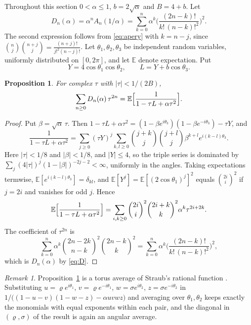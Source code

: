 \documentclass[11pt]{amsart}
\numberwithin{equation}{section}
\newtheorem{proposition}[theorem]{Proposition}
\theoremstyle{definition}
\theoremstyle{remark}
\newtheorem{remark}[theorem]{Remark}
\newcommand{\E}{\mathbb{E}}
\begin{document}
Throughout this section $0<\alpha\le1$, $b=2\sqrt\alpha$ and $B=4+b$. Let
\begin{equation}\label{eq:D}
D_n(\alpha)=\alpha^nA_n(1/\alpha)=\sum_{k=0}^{n}\alpha^k\biggl(\frac{(2n-k)!}{k!\,(n-k)!^2}\biggr)^2 .
\end{equation}
The second expression follows from \eqref{eq:apery} with $k=n-j$, since
$\binom nj\binom{n+j}{j}=\frac{(n+j)!}{j!^2(n-j)!}$. Let
$\theta_1,\theta_2,\theta_3$ be independent random variables, uniformly
distributed on $[0,2\pi]$, and let $\E$ denote expectation. Put
\[
Y=4\cos\theta_1\cos\theta_2,\qquad L=Y+b\cos\theta_3 .
\]

\begin{proposition}\label{prop:spectral}
For complex $\tau$ with $|\tau|<1/(2B)$,
\begin{equation}\label{eq:spectral}
\sum_{n\ge0}D_n(\alpha)\,\tau^{2n}=\E\Bigl[\frac{1}{1-\tau L+\alpha\tau^2}\Bigr].
\end{equation}
\end{proposition}

\begin{proof}
Put $\beta=\sqrt\alpha\,\tau$. Then
$1-\tau L+\alpha\tau^2=(1-\beta e^{i\theta_3})(1-\beta e^{-i\theta_3})-\tau Y$,
and
\[
\frac{1}{1-\tau L+\alpha\tau^2}
=\sum_{j\ge0}(\tau Y)^j\sum_{k,l\ge0}\binom{j+k}{j}\binom{j+l}{j}\beta^{k+l}e^{i(k-l)\theta_3}.
\]
Here $|\tau|<1/8$ and $|\beta|<1/8$, and $|Y|\le4$, so the triple series is
dominated by $\sum_j(4|\tau|)^j(1-|\beta|)^{-2j-2}<\infty$, uniformly in the
angles. Taking expectations termwise, $\E[e^{i(k-l)\theta_3}]=\delta_{kl}$,
and $\E[Y^j]=\E[(2\cos\theta_1)^j]^2$ equals $\binom{2i}{i}^2$ if $j=2i$ and
vanishes for odd $j$. Hence
\[
\E\Bigl[\frac{1}{1-\tau L+\alpha\tau^2}\Bigr]
=\sum_{i,k\ge0}\binom{2i}{i}^2\binom{2i+k}{k}^2\alpha^k\tau^{2i+2k}.
\]
The coefficient of $\tau^{2n}$ is
\[
\sum_{k=0}^n\alpha^k\binom{2n-2k}{n-k}^2\binom{2n-k}{k}^2
=\sum_{k=0}^n\alpha^k\biggl(\frac{(2n-k)!}{k!\,(n-k)!^2}\biggr)^2,
\]
which is $D_n(\alpha)$ by \eqref{eq:D}.
\end{proof}

\begin{remark}\label{rem:torus}
Proposition~\ref{prop:spectral} is a torus average of Straub's rational
function \cite[Theorem~3.1]{St}. Substituting $u=\varrho e^{i\theta_1}$,
$v=\varrho e^{-i\theta_1}$, $w=\sigma e^{i\theta_2}$, $z=\sigma e^{-i\theta_2}$
in $1/\bigl((1-u-v)(1-w-z)-\alpha uvwz\bigr)$ and averaging over
$\theta_1,\theta_2$ keeps exactly the monomials with equal exponents within
each pair, and the diagonal in $(\varrho,\sigma)$ of the result is again an
angular average.
\end{remark}
\end{document}
